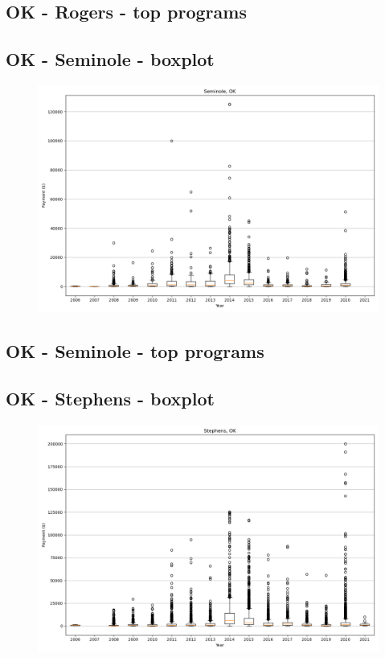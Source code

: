 \subsection*{OK - Rogers - top programs}

\newpage
\subsection*{OK - Seminole - boxplot}
\begin{figure}[h]
\centering
\includegraphics[width=7in]{../output/boxplots/counties/Seminole-OK_boxplot.png}
\end{figure}


\subsection*{OK - Seminole - top programs}

\newpage
\subsection*{OK - Stephens - boxplot}
\begin{figure}[h]
\centering
\includegraphics[width=7in]{../output/boxplots/counties/Stephens-OK_boxplot.png}
\end{figure}


